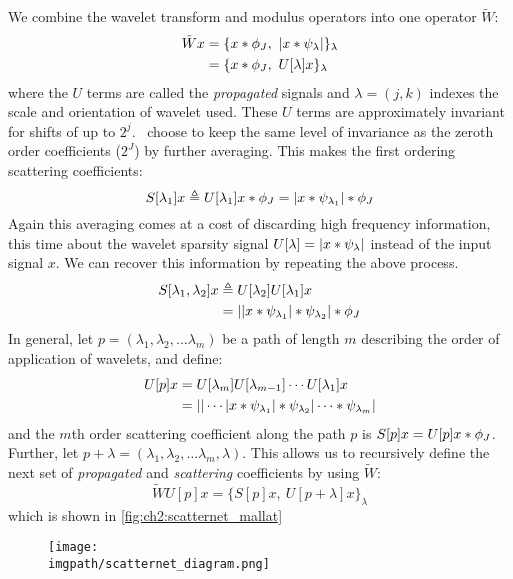 We combine the wavelet transform and modulus operators into one operator
$\tilde{W}$:
\begin{align}
  \tilde{W}x &= \{ x \ast \phi_J,\ |x \ast \psi_\lambda| \}_\lambda \label{eq:ch2:wave3}\\
             &= \{ x \ast \phi_J,\ U[\lambda]x \}_\lambda 
\end{align}
where the $U$ terms are called the \emph{propagated} signals and $\lambda =
(j,k)$ indexes the scale and orientation of wavelet used.
These $U$ terms are approximately invariant for shifts of up to $2^j$. \Mallat\ choose to
keep the same level of invariance as the zeroth order coefficients ($2^J$) 
by further averaging. This makes the first ordering scattering coefficients:
\begin{equation}
  S[\lambda_1]x \triangleq U[\lambda_1]x \ast \phi_J
  = |x \ast \psi_{\lambda_1}| \ast \phi_J
\end{equation}
Again this averaging comes at a cost of discarding high frequency information,
this time about the wavelet sparsity signal $U[\lambda] = |x \ast
\psi_\lambda|$ instead of the input signal $x$. We can recover this information
by repeating the above process. 
\begin{align}
  S[\lambda_1, \lambda_2]x &\triangleq U[\lambda_2]U[\lambda_1]x \\
                           &=||x \ast \psi_{\lambda_1}| \ast \psi_{\lambda_2}| \ast \phi_J
\end{align}
In general, let $p=(\lambda_1, \lambda_2, \ldots \lambda_m)$ be a path of length
$m$ describing the order of application of wavelets, and define:
\begin{align}
  U[p]x &= U[\lambda_m]U[\lambda_{m-1}]\cdots U[\lambda_1]x \\
        &= || \cdots |x \ast \psi_{\lambda_1}| \ast \psi_{\lambda_2} | \cdots
  \ast \psi_{\lambda_m}|
\end{align}
and the $m$th order scattering coefficient along the path $p$ is $S[p]x = U[p]x
\ast \phi_J$. Further, let $p+\lambda = (\lambda_1, \lambda_2, \ldots
\lambda_m, \lambda)$.  This allows us to recursively define the next set of
\emph{propagated} and \emph{scattering} coefficients by using $\tilde{W}$:
\begin{equation}
  \tilde{W}U[p]x = \{ S[p]x,\ U[p+\lambda]x \}_\lambda \label{eq:ch2:recursive}
\end{equation}
which is shown in \autoref{fig:ch2:scatternet_mallat}
  \begin{figure}
    \centering
      \texttt{[image: \\imgpath/scatternet\_diagram.png]}
      \label{fig:ch2:scatternet_mallat}
  \end{figure}

